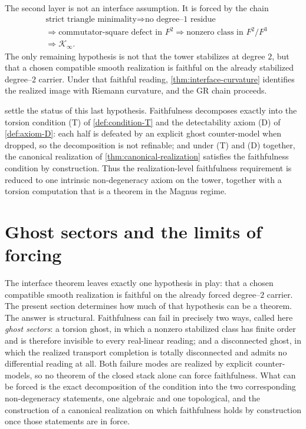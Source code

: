 \begin{remark}
\label{rem:second-jet-status}
The second layer is not an interface assumption.  It is forced by the
chain
\[
\begin{aligned}
&\text{strict triangle minimality}
\Longrightarrow
\text{no degree--1 residue}
\\
&\Longrightarrow
\text{commutator-square defect in }F^2
\Longrightarrow
\text{nonzero class in }F^2/F^3
\\
&\Longrightarrow
\mathcal K_\infty.
\end{aligned}
\]
The only remaining hypothesis is not that the tower stabilizes at degree
\(2\), but that a chosen compatible smooth realization is faithful on the
already stabilized degree--\(2\) carrier.  Under that faithful reading,
\cref{thm:interface-curvature} identifies the realized image with Riemann
curvature, and the GR chain proceeds.

settle the status of this last hypothesis.  Faithfulness decomposes
exactly into the torsion condition \textup{(T)} of
\cref{def:condition-T} and the detectability axiom \textup{(D)} of
\cref{def:axiom-D}: each half is defeated by an explicit ghost
counter-model when dropped, so the decomposition is not refinable; and
under \textup{(T)} and \textup{(D)} together, the canonical realization
of \cref{thm:canonical-realization} satisfies the faithfulness
condition by construction.  Thus the realization-level faithfulness
requirement is reduced to one intrinsic non-degeneracy axiom on the tower,
together with a torsion computation that is a theorem in the Magnus regime.
\end{remark}
\section{Ghost sectors and the limits of forcing}
\label{sec:interface-ghosts}
The interface theorem leaves exactly one hypothesis in play: that a
chosen compatible smooth realization is faithful on the already forced
degree--\(2\) carrier.  The present section determines how much of that
hypothesis can be a theorem.  The answer is structural.  Faithfulness
can fail in precisely two ways, called here \emph{ghost sectors}: a
torsion ghost, in which a nonzero stabilized class has finite order and
is therefore invisible to every real-linear reading; and a disconnected
ghost, in which the realized transport completion is totally
disconnected and admits no differential reading at all.  Both failure
modes are realized by explicit counter-models, so no theorem of the
closed stack alone can force faithfulness.  What can be forced is the
exact decomposition of the condition into the two corresponding
non-degeneracy statements, one algebraic and one topological, and the
construction of a canonical realization on which faithfulness holds by
construction once those statements are in force.

